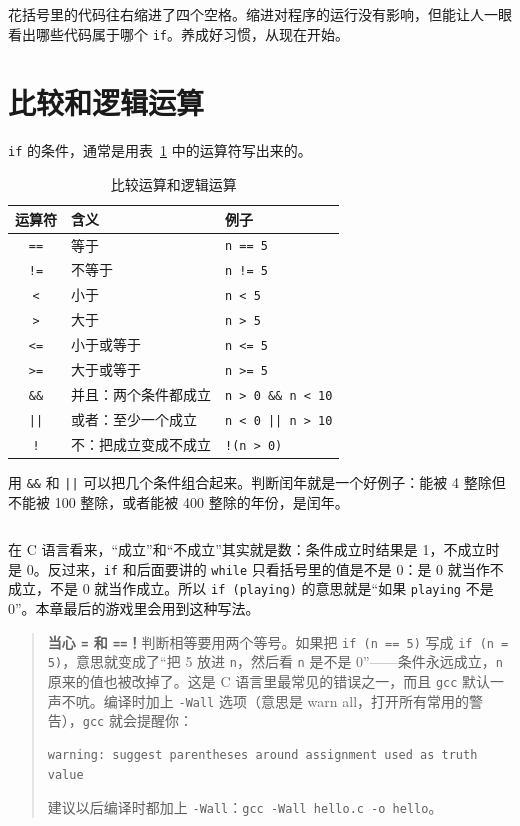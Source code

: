 花括号里的代码往右缩进了四个空格。缩进对程序的运行没有影响，但能让人一眼看出哪些代码属于哪个 \texttt{if}。养成好习惯，从现在开始。

\section{比较和逻辑运算}
\label{sec:logic}

\texttt{if} 的条件，通常是用表~\ref{tab:compare-ops} 中的运算符写出来的。

\begin{table}[htbp]
  \centering
  \caption{比较运算和逻辑运算}
  \label{tab:compare-ops}
  \begin{tabular}{cll}
    \toprule
    运算符 & 含义 & 例子 \\
    \midrule
    \texttt{==} & 等于     & \texttt{n == 5} \\
    \texttt{!=} & 不等于   & \texttt{n != 5} \\
    \texttt{<}  & 小于     & \texttt{n < 5} \\
    \texttt{>}  & 大于     & \texttt{n > 5} \\
    \texttt{<=} & 小于或等于 & \texttt{n <= 5} \\
    \texttt{>=} & 大于或等于 & \texttt{n >= 5} \\
    \midrule
    \texttt{\&\&} & 并且：两个条件都成立 & \texttt{n > 0 \&\& n < 10} \\
    \texttt{||}   & 或者：至少一个成立   & \texttt{n < 0 || n > 10} \\
    \texttt{!}    & 不：把成立变成不成立 & \texttt{!(n > 0)} \\
    \bottomrule
  \end{tabular}
\end{table}

用 \texttt{\&\&} 和 \texttt{||} 可以把几个条件组合起来。判断闰年就是一个好例子：能被 4 整除但不能被 100 整除，或者能被 400 整除的年份，是闰年。


\inputminted[linenos=false]{text}{code/ch02/out/leap.txt}

在 C 语言看来，“成立”和“不成立”其实就是数：条件成立时结果是 1，不成立时是 0。反过来，\texttt{if} 和后面要讲的 \texttt{while} 只看括号里的值是不是 0：是 0 就当作不成立，不是 0 就当作成立。所以 \texttt{if (playing)} 的意思就是“如果 \texttt{playing} 不是 0”。本章最后的游戏里会用到这种写法。

\begin{quote}
  \textbf{当心 \texttt{=} 和 \texttt{==}！}判断相等要用两个等号。如果把 \texttt{if (n == 5)} 写成 \texttt{if (n = 5)}，意思就变成了“把 5 放进 \texttt{n}，然后看 \texttt{n} 是不是 0”——条件永远成立，\texttt{n} 原来的值也被改掉了。这是 C 语言里最常见的错误之一，而且 \texttt{gcc} 默认一声不吭。编译时加上 \texttt{-Wall} 选项（意思是 warn all，打开所有常用的警告），\texttt{gcc} 就会提醒你：
\begin{verbatim}
warning: suggest parentheses around assignment used as truth value
\end{verbatim}
  建议以后编译时都加上 \texttt{-Wall}：\texttt{gcc -Wall hello.c -o hello}。
\end{quote}

